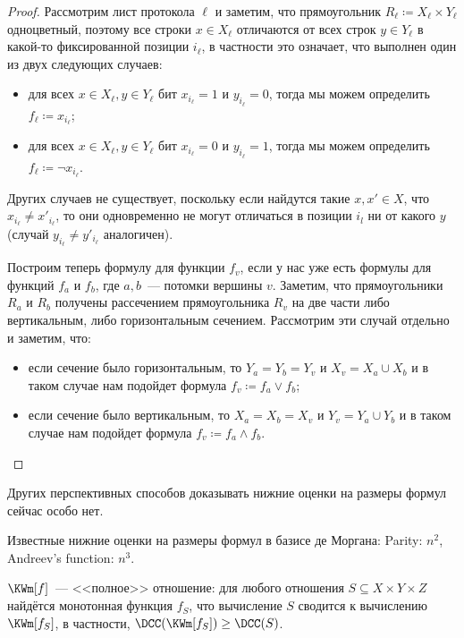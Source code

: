 \begin{proof}
    Рассмотрим лист протокола $\ell$ и заметим, что прямоугольник $R_{\ell} \coloneqq X_{\ell} \times
    Y_{\ell}$ одноцветный, поэтому все строки $x \in X_{\ell}$ отличаются от всех строк $y \in Y_{\ell}$
    в какой-то фиксированной позиции $i_{\ell}$, в частности это означает, что выполнен один из двух
    следующих случаев:
    \begin{itemize}
        \item для всех $x \in X_{\ell}, y \in Y_{\ell}$ бит $x_{i_{\ell}} = 1$ и $y_{i_{\ell}} = 0$,
            тогда мы можем определить $f_{\ell} \coloneqq x_{i_{\ell}}$;
        \item для всех $x \in X_{\ell}, y \in Y_{\ell}$ бит $x_{i_{\ell}} = 0$ и $y_{i_{\ell}} = 1$,
            тогда мы можем определить $f_{\ell} \coloneqq \neg x_{i_{\ell}}$.
    \end{itemize}
    Других случаев не существует, поскольку если найдутся такие $x, x' \in X$, что $x_{i_{\ell}} \neq
    x'_{i_{\ell}}$, то они одновременно не могут отличаться в позиции $i_l$ ни от какого $y$ (случай
    $y_{i_{\ell}} \neq y'_{i_{\ell}}$ аналогичен).

    Построим теперь формулу для функции $f_v$, если у нас уже есть формулы для функций $f_a$ и $f_b$, где
    $a, b$~--- потомки вершины $v$. Заметим, что прямоугольники $R_a$ и $R_b$ получены рассечением
    прямоугольника $R_v$ на две части либо вертикальным, либо горизонтальным сечением. Рассмотрим эти
    случай отдельно и заметим, что:
    \begin{itemize}
        \item если сечение было горизонтальным, то $Y_a = Y_b = Y_v$ и $X_v = X_a \cup X_b$ и в таком
            случае нам подойдет формула $f_v \coloneqq f_a \vee f_b$;
        \item если сечение было вертикальным, то $X_a = X_b = X_v$ и $Y_v = Y_a \cup Y_b$ и в таком
            случае нам подойдет формула $f_v \coloneqq f_a \wedge f_b$.
    \end{itemize}
\end{proof}


Других перспективных способов доказывать нижние оценки на размеры формул сейчас особо нет.

\begin{remark}
    Известные нижние оценки на размеры формул в базисе де Моргана: Parity: $n^2$, Andreev's function:
    $n^3$.
\end{remark}



\begin{theorem}
    \label{KW is a complete relation}
    $\KWm[f]$~--- <<полное>> отношение: для любого отношения $S \subseteq X\times Y\times Z$ найдётся
    монотонная функция $f_S$, что вычисление $S$ сводится к вычислению $\KWm[f_S]$, в частности,
    $\DCC(\KWm[f_S]) \ge \DCC(S)$.
\end{theorem}

